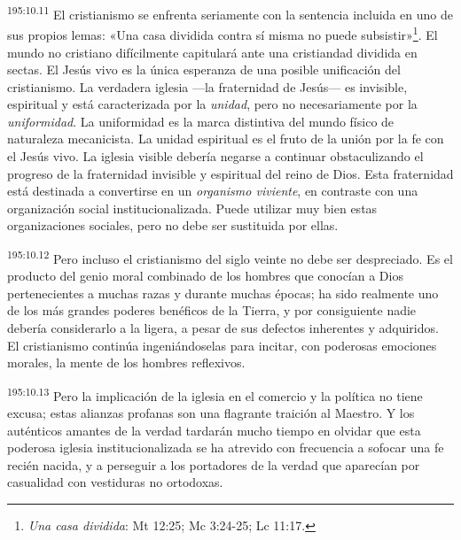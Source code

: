 \par 
\textsuperscript{195:10.11} El cristianismo se enfrenta seriamente con la sentencia incluida en uno de sus propios lemas: «Una casa dividida contra sí misma no puede subsistir»\footnote{\textit{Una casa dividida}: Mt 12:25; Mc 3:24-25; Lc 11:17.}. El mundo no cristiano difícilmente capitulará ante una cristiandad dividida en sectas. El Jesús vivo es la única esperanza de una posible unificación del cristianismo. La verdadera iglesia ---la fraternidad de Jesús--- es invisible, espiritual y está caracterizada por la \textit{unidad}, pero no necesariamente por la \textit{uniformidad}. La uniformidad es la marca distintiva del mundo físico de naturaleza mecanicista. La unidad espiritual es el fruto de la unión por la fe con el Jesús vivo. La iglesia visible debería negarse a continuar obstaculizando el progreso de la fraternidad invisible y espiritual del reino de Dios. Esta fraternidad está destinada a convertirse en un \textit{organismo viviente}, en contraste con una organización social institucionalizada. Puede utilizar muy bien estas organizaciones sociales, pero no debe ser sustituida por ellas.

\par 
\textsuperscript{195:10.12} Pero incluso el cristianismo del siglo veinte no debe ser despreciado. Es el producto del genio moral combinado de los hombres que conocían a Dios pertenecientes a muchas razas y durante muchas épocas; ha sido realmente uno de los más grandes poderes benéficos de la Tierra, y por consiguiente nadie debería considerarlo a la ligera, a pesar de sus defectos inherentes y adquiridos. El cristianismo continúa ingeniándoselas para incitar, con poderosas emociones morales, la mente de los hombres reflexivos.

\par 
\textsuperscript{195:10.13} Pero la implicación de la iglesia en el comercio y la política no tiene excusa; estas alianzas profanas son una flagrante traición al Maestro. Y los auténticos amantes de la verdad tardarán mucho tiempo en olvidar que esta poderosa iglesia institucionalizada se ha atrevido con frecuencia a sofocar una fe recién nacida, y a perseguir a los portadores de la verdad que aparecían por casualidad con vestiduras no ortodoxas.

